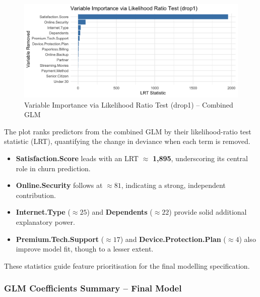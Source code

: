 \documentclass[
]{article}
\providecommand{\tightlist}{%
  \setlength{\itemsep}{0pt}\setlength{\parskip}{0pt}}
\begin{document}
\begin{figure}

{\centering \includegraphics[width=0.85\linewidth]{glm_gam_plots/drop1_merge} 

}

\caption{Variable Importance via Likelihood Ratio Test (drop1) – Combined GLM}\label{fig:drop1-merged-glm-img}
\end{figure}

The plot ranks predictors from the combined GLM by their
likelihood-ratio test statistic (LRT), quantifying the change in
deviance when each term is removed.

\begin{itemize}
\tightlist
\item
  \textbf{Satisfaction.Score} leads with an LRT \(\approx\)
  \textbf{1,895}, underscoring its central role in churn prediction.\\
\item
  \textbf{Online.Security} follows at \textbf{\(\approx 81\)},
  indicating a strong, independent contribution.\\
\item
  \textbf{Internet.Type} (\textbf{\(\approx 25\)}) and
  \textbf{Dependents} (\textbf{\(\approx 22\)}) provide solid additional
  explanatory power.\\
\item
  \textbf{Premium.Tech.Support} (\textbf{\(\approx 17\)}) and
  \textbf{Device.Protection.Plan} (\textbf{\(\approx 4\)}) also improve
  model fit, though to a lesser extent.
\end{itemize}

These statistics guide feature prioritisation for the final modelling
specification.

\hypertarget{glm-coefficients-summary-final-model}{%
\subsubsection{GLM Coefficients Summary -- Final
Model}\label{glm-coefficients-summary-final-model}}
\end{document}
